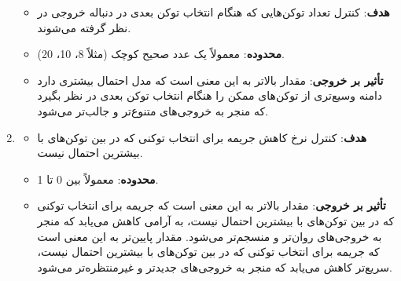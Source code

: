 \begin{enumerate}
            \begin{itemize}
                  \item
                        \textbf{هدف}: کنترل تعداد توکن‌هایی که هنگام انتخاب توکن بعدی در
                        دنباله خروجی در نظر گرفته می‌شوند.
                  \item
                        \textbf{محدوده}: معمولاً یک عدد صحیح کوچک (مثلاً 8، 10، 20).
                  \item
                        \textbf{تأثیر بر خروجی}: مقدار  بالاتر به این معنی است که مدل
                        احتمال بیشتری دارد دامنه وسیع‌تری از توکن‌های ممکن را هنگام انتخاب
                        توکن بعدی در نظر بگیرد که منجر به خروجی‌های متنوع‌تر و جالب‌تر می‌شود.
            \end{itemize}
      \item
            \textbf{}

            \begin{itemize}
                  \item
                        \textbf{هدف}: کنترل نرخ کاهش جریمه برای انتخاب توکنی که در بین
                        توکن‌های با بیشترین احتمال  نیست.
                  \item
                        \textbf{محدوده}: معمولاً بین 0 تا 1.
                  \item
                        \textbf{تأثیر بر خروجی}: مقدار  بالاتر به این معنی است
                        که جریمه برای انتخاب توکنی که در بین توکن‌های با بیشترین احتمال 
                        نیست، به آرامی کاهش می‌یابد که منجر به خروجی‌های روان‌تر و منسجم‌تر
                        می‌شود. مقدار  پایین‌تر به این معنی است که جریمه برای
                        انتخاب توکنی که در بین توکن‌های با بیشترین احتمال  نیست، سریع‌تر
                        کاهش می‌یابد که منجر به خروجی‌های جدیدتر و غیرمنتظره‌تر می‌شود.
            \end{itemize}
\end{enumerate}

